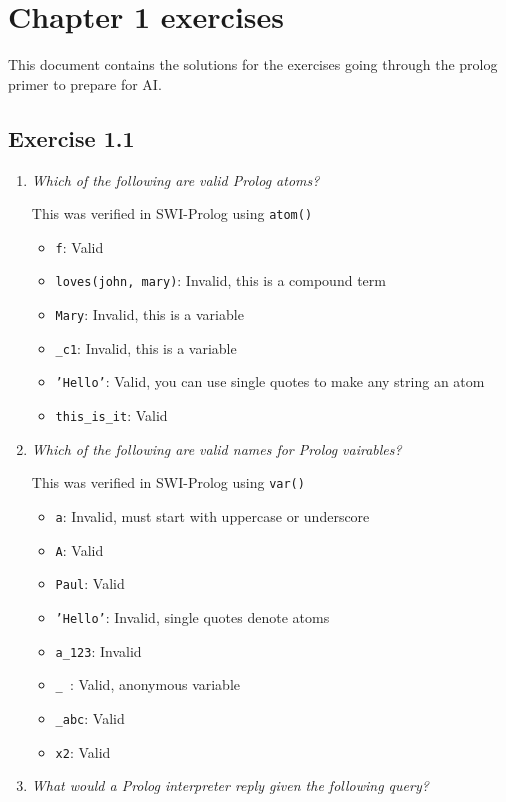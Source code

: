 \documentclass{report}
\newcommand{\code}[1]{\texttt{#1}}
\begin{document}
\chapter*{Chapter 1 exercises}
This document contains the solutions for the exercises going through the prolog primer to prepare for AI.
\section*{\textbf{Exercise 1.1}}
\begin{enumerate}[label=(\alph*)]
    \item \emph{Which of the following are valid Prolog atoms?}
    
    This was verified in SWI-Prolog using \code{atom()}
    \begin{itemize}[label={}]
        \item \code{f}: Valid 
        \item \code{loves(john, mary)}: Invalid, this is a compound term
        \item \code{Mary}: Invalid, this is a variable
        \item \code{\_c1}: Invalid, this is a variable
        \item \code{'Hello'}: Valid, you can use single quotes to make any string an atom
        \item \code{this\_is\_it}: Valid
    \end{itemize}

    \item \emph{Which of the following are valid names for Prolog vairables?}
    
    This was verified in SWI-Prolog using \code{var()}
    \begin{itemize}[label={}]
        \item \code{a}: Invalid, must start with uppercase or underscore
        \item \code{A}: Valid
        \item \code{Paul}: Valid
        \item \code{'Hello'}: Invalid, single quotes denote atoms
        \item \code{a\_123}: Invalid
        \item \code{\_ }: Valid, anonymous variable
        \item \code{\_abc}: Valid
        \item \code{x2}: Valid
    \end{itemize}

    \item \emph{What would a Prolog interpreter reply given the following query?}


\end{enumerate}
\end{document}
